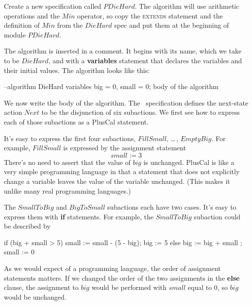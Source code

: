 Create a new specification called $PDieHard$.  The algorithm will use
arithmetic operations and the $Min$ operator, so copy the \textsc{extends}
statement and the definition of $Min$ from the $DieHard$ spec and
put them at the beginning of module $PDieHard$. 


The algorithm is inserted in a comment.  It begins with its name,
which we take to be $DieHard$, and with a 
\textbf{variables} statement
that declares the variables and their initial values.  The algorithm
looks like this:
\begin{display}
\begin{nopcal}
--algorithm DieHard  {
     variables big = 0, small = 0;  
     {  \* body of the algorithm
     }
}
\end{nopcal}
\begin{tlatex}
%
%
%
%
\@xx{}%
%
\@x{ {\p@rbrace}}%
\end{tlatex}
\end{display}
We now write the body of the algorithm.
The \tlaplus\ specification defines the next-state action $Next$ to be
the disjunction of six subactions.  We first see how to express each
of those subactions as a PlusCal statement.  

It's easy to express the
first four subactions, $FillSmall$, \ldots\,, $EmptyBig$.  For example,
$FillSmall$ is expressed by the assignment statement
 \[ small := 3 \]
There's no need to assert that the value of $big$ is unchanged.
PlusCal is like a very simple programming language in that a statement
that does not explicitly change a variable leaves the value of the
variable unchanged.  (This makes it unlike many real programming
languages.)

The $SmallToBig$ and $BigToSmall$ subactions each have two cases.
It's easy to express them with \textbf{if} statements.  For example,
the $SmallToBig$ subaction could be described by
\begin{display}
\begin{nopcal}
if (big + small > 5) { small := small - (5 - big); 
                       big := 5                     }
else { big := big + small ;
       small := 0           }
\end{nopcal}
\begin{tlatex}
%
%
\end{tlatex}
\end{display}
As we would expect of a programming language, the order of assignment
statements matters.  If we changed the order of the two assignments in
the \textbf{else} clause, the assignment to $big$ would be performed
with $small$ equal to 0, so $big$ would be unchanged.

